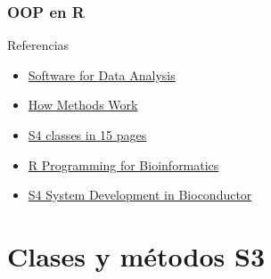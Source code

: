 \documentclass[xcolor={usenames,svgnames,dvipsnames}]{beamer}
\begin{document}
\begin{frame}
\frametitle{OOP en R}
\label{sec-1-1-2}
\begin{block}{Referencias}
\label{sec-1-1-2-1}

\begin{center}
\begin{itemize}
\item \href{http://books.google.es/books/about/Software_for_Data_Analysis.html}{Software for Data Analysis}
\item \href{http://developer.r-project.org/howMethodsWork.pdf}{How Methods Work}
\item \href{http://www.stat.auckland.ac.nz/S-Workshop/Gentleman/S4Objects.pdf}{S4 classes in 15 pages}
\item \href{http://bioconductor.org/help/publications/books/r-programming-for-bioinformatics/}{R Programming for Bioinformatics }
\item \href{http://bioconductor.org/help/course-materials/2010/AdvancedR/S4InBioconductor.pdf}{S4 System Development in Bioconductor}
\end{itemize}

\end{center}
\end{block}
\end{frame}
\section{Clases y métodos S3}
\label{sec-2}
\end{document}

